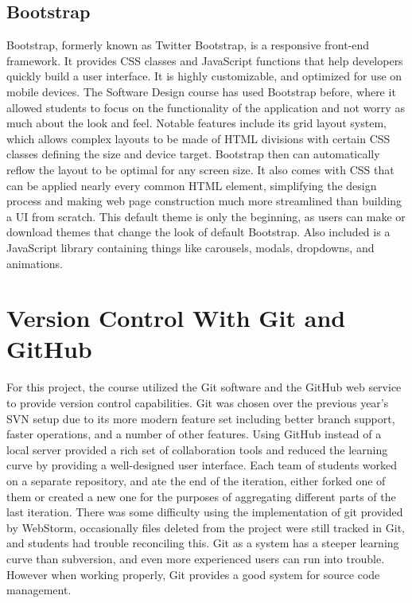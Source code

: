\documentclass[12pt]{article}
\begin{document}
\subsection{Bootstrap}\label{sec:bootstrap}
Bootstrap, formerly known as Twitter Bootstrap, is a responsive front-end framework. It provides CSS classes and JavaScript functions that help developers quickly build a user interface. It is highly customizable, and optimized for use on mobile devices. The Software Design course has used Bootstrap before, where it allowed students to focus on the functionality of the application and not worry as much about the look and feel. Notable features include its grid layout system, which allows complex layouts to be made of HTML divisions with certain CSS classes defining the size and device target. Bootstrap then can automatically reflow the layout to be optimal for any screen size. It also comes with CSS that can be applied nearly every common HTML element, simplifying the design process and making web page construction much more streamlined than building a UI from scratch. This default theme is only the beginning, as users can make or download themes that change the look of default Bootstrap. Also included is a JavaScript library containing things like carousels, modals, dropdowns, and animations.

\section{Version Control With Git and GitHub}\label{sec:git}
For this project, the course utilized the Git software and the GitHub web service to provide version control capabilities. Git was chosen over the previous year's SVN setup due to its more modern feature set including better branch support, faster operations, and a number of other features. Using GitHub instead of a local server provided a rich set of collaboration tools and reduced the learning curve by providing a well-designed user interface. Each team of students worked on a separate repository, and ate the end of the iteration, either forked one of them or created a new one for the purposes of aggregating different parts of the last iteration. There was some difficulty using the implementation of git provided by WebStorm, occasionally files deleted from the project were still tracked in Git, and students had trouble reconciling this. Git as a system has a steeper learning curve than subversion, and even more experienced users can run into trouble. However when working properly, Git provides a good system for source code management.
\end{document}
